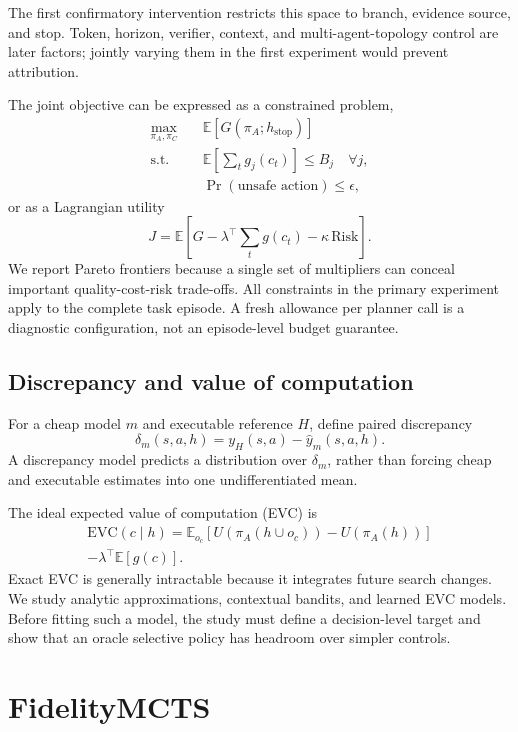 \documentclass[10pt,twocolumn]{article}
\newcommand{\E}{\mathbb{E}}
\begin{document}
The first confirmatory intervention restricts this space to branch, evidence
source, and stop. Token, horizon, verifier, context, and multi-agent-topology
control are later factors; jointly varying them in the first experiment would
prevent attribution.

The joint objective can be expressed as a constrained problem,
\begin{align}
\max_{\pi_A,\pi_C}\quad
    & \E\!\left[G(\pi_A;h_{\mathrm{stop}})\right] \\
\text{s.t.}\quad
    & \E\!\left[\sum_t g_j(c_t)\right]\le B_j
      \quad \forall j,                                      \label{eq:budget}\\
    & \Pr(\text{unsafe action})\le \epsilon ,
\end{align}
or as a Lagrangian utility
\[
J = \E\!\left[
G - \lambda^\top \sum_t g(c_t) - \kappa\,\mathrm{Risk}
\right].
\]
We report Pareto frontiers because a single set of multipliers can conceal
important quality-cost-risk trade-offs.
All constraints in the primary experiment apply to the complete task episode.
A fresh allowance per planner call is a diagnostic configuration, not an
episode-level budget guarantee.

\subsection{Discrepancy and value of computation}

For a cheap model \(m\) and executable reference \(H\), define paired
discrepancy
\[
\delta_m(s,a,h)=y_H(s,a)-\hat y_m(s,a,h).
\]
A discrepancy model predicts a distribution over \(\delta_m\), rather than
forcing cheap and executable estimates into one undifferentiated mean.

The ideal expected value of computation (EVC) is
\begin{multline}
\mathrm{EVC}(c\mid h)
=
\E_{o_c}\!\left[
U(\pi_A(h\cup o_c))-U(\pi_A(h))
\right]\\
-\lambda^\top \E[g(c)] .
\label{eq:evc}
\end{multline}
Exact EVC is generally intractable because it integrates future search changes.
We study analytic approximations, contextual bandits, and learned EVC models.
Before fitting such a model, the study must define a decision-level target and
show that an oracle selective policy has headroom over simpler controls.

\section{FidelityMCTS}
\end{document}
